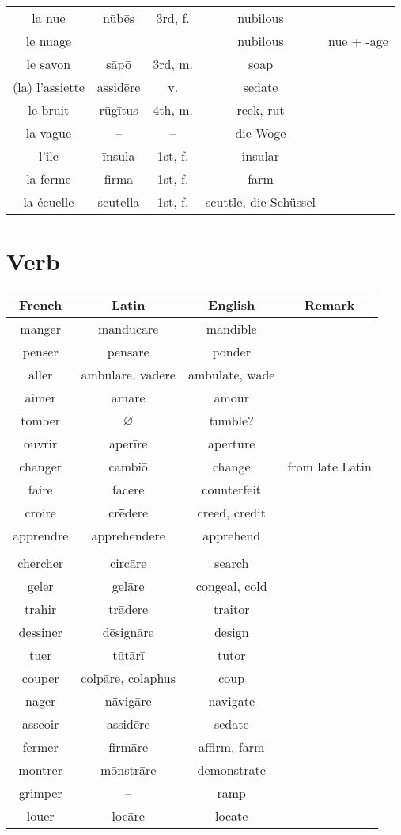 \documentclass{article}
\begin{document}
\begin{longtable}{ccccc}
    la nue & n\=ub\=es & 3rd, f. & nubilous \\
    le nuage & & & nubilous & nue + -age \\
    le savon & s\=ap\=o & 3rd, m. & soap \\
    (la) l'assiette & assid\=ere & v. & sedate \\
    le bruit & r\=ug\=itus & 4th, m. & reek, rut \\
    la vague & -- & -- & die Woge  \\
    l'\^ile & \=insula & 1st, f. & insular \\
    la ferme & firma & 1st, f. & farm \\
    la \'ecuelle & scutella & 1st, f. & scuttle, die Sch\"ussel \\
    \bottomrule
\end{longtable}

\section{Verb}

\begin{longtable}{cccc}
    \toprule
    French & Latin & English & Remark \\
    \midrule
    manger & mand\=uc\=are & mandible \\
    penser & p\=ens\=are & ponder \\
    aller & ambul\=are, v\=adere & ambulate, wade \\
    aimer & am\=are & amour \\
    tomber & $\varnothing$ & tumble? \\
    ouvrir & aper\=ire & aperture \\
    changer & cambi\=o & change & from late Latin \\
    faire & facere & counterfeit \\
    croire & cr\=ēdere & creed, credit \\
    apprendre & apprehendere & apprehend \\
    \\
    chercher & circ\=are & search \\
    geler & gel\=are & congeal, cold \\
    trahir & tr\=adere & traitor \\
    dessiner & d\=esign\=are & design \\
    tuer & t\=ut\=ar\=i & tutor \\
    couper & colp\=are, colaphus & coup & \\
    nager & n\=avig\=are & navigate \\
    asseoir & assid\=ere & sedate \\
    fermer & firm\=are & affirm, farm \\
    montrer & m\=onstr\=are & demonstrate \\
    grimper & -- & ramp \\
    louer & loc\=are & locate \\
    \bottomrule
\end{longtable}
\end{document}
